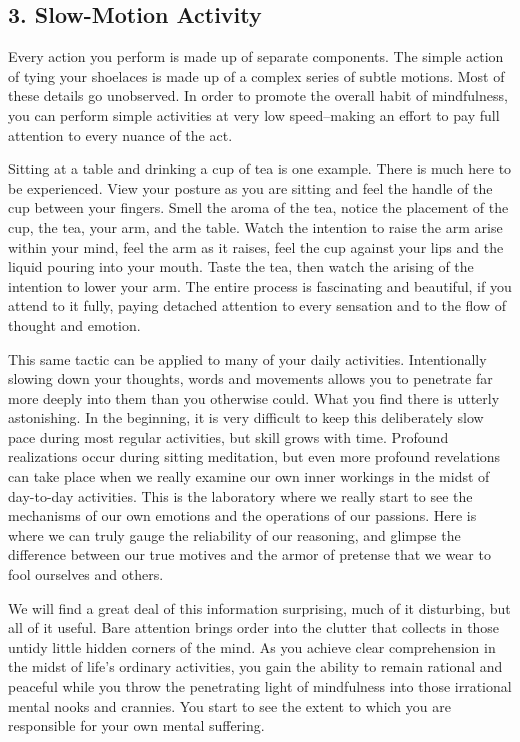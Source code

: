 \subsection*{3. Slow-Motion Activity}
Every action you perform is made up of separate
components. The simple action of tying your shoelaces is made up of a complex
series of subtle motions. Most of these details go unobserved. In order to
promote the overall habit of mindfulness, you can perform simple activities at
very low speed--making an effort to pay full attention to every nuance of the
act.

Sitting at a table and drinking a cup of tea is one example. There is much here
to be experienced. View your posture as you are sitting and feel the handle of
the cup between your fingers. Smell the aroma of the tea, notice the placement
of the cup, the tea, your arm, and the table. Watch the intention to raise the
arm arise within your mind, feel the arm as it raises, feel the cup against your
lips and the liquid pouring into your mouth. Taste the tea, then watch the
arising of the intention to lower your arm. The entire process is fascinating
and beautiful, if you attend to it fully, paying detached attention to every
sensation and to the flow of thought and emotion.

This same tactic can be applied to many of your daily activities. Intentionally
slowing down your thoughts, words and movements allows you to penetrate far more
deeply into them than you otherwise could. What you find there is utterly
astonishing. In the beginning, it is very difficult to keep this deliberately
slow pace during most regular activities, but skill grows with time. Profound
realizations occur during sitting meditation, but even more profound revelations
can take place when we really examine our own inner workings in the midst of
day-to-day activities. This is the laboratory where we really start to see the
mechanisms of our own emotions and the operations of our passions. Here is where
we can truly gauge the reliability of our reasoning, and glimpse the difference
between our true motives and the armor of pretense that we wear to fool
ourselves and others.

We will find a great deal of this information surprising, much of it disturbing,
but all of it useful. Bare attention brings order into the clutter that collects
in those untidy little hidden corners of the mind. As you achieve clear
comprehension in the midst of life's ordinary activities, you gain the ability
to remain rational and peaceful while you throw the penetrating light of
mindfulness into those irrational mental nooks and crannies. You start to see
the extent to which you are responsible for your own mental suffering.

